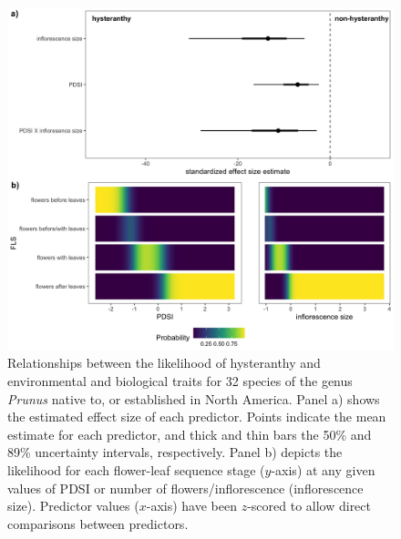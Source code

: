 \documentclass{article}[12pt]
\begin{document}
{\begin{figure}[h!]
    \centering
 \includegraphics[width=\textwidth]{..//..//Plots/whatReviwerswant/fullprunus_4manu.jpeg} %
    \caption{Relationships between the likelihood of hysteranthy and environmental and biological traits for 32 species of the genus \emph{Prunus} native to, or established in North America. Panel a) shows the estimated effect size of each predictor. Points indicate the mean estimate for each predictor, and thick and thin bars the 50\% and 89\% uncertainty intervals, respectively. Panel b) depicts the likelihood for each flower-leaf sequence stage ($y$-axis) at any given values of PDSI or number of flowers/inflorescence (inflorescence size). Predictor values ($x$-axis) have been $z$-scored to allow direct comparisons between predictors.}
    \label{fig:genus}
\end{figure}

}
\end{document}
